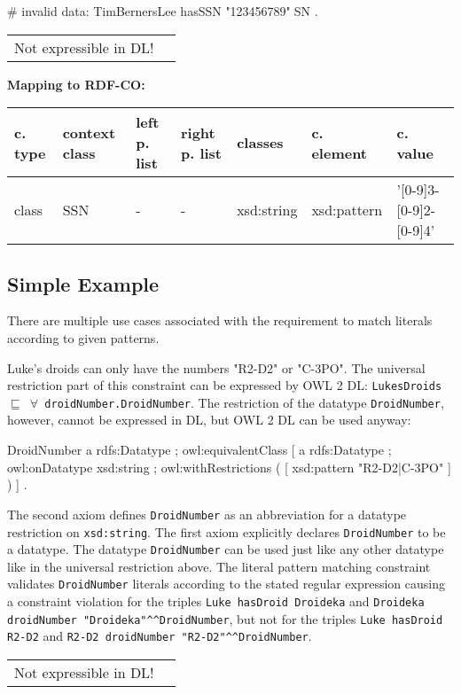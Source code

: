 \documentclass{llncs}
\newcommand{\ms}[1]{\texttt{#1}}
\newenvironment{gcotable}{
  \scriptsize
  \sffamily
  \vspace{0cm}
	\begin{center}
	\textbf{\vspace{0.4cm}Mapping to RDF-CO:} \\
  \begin{tabular}{l|l|l|l|l|l|l}
	\hline
  \textbf{c. type} & \textbf{context class} & \textbf{left p. list} & \textbf{right p. list} & \textbf{classes} & \textbf{c. element} & \textbf{c. value} \\
  \hline

}{
  \hline
  \end{tabular}
	\end{center}
}
\newenvironment{DL}{
  \vspace{0cm}
	\begin{center}
  \begin{tabular}{r l}

}{
  \end{tabular}
	\end{center}
}
\begin{document}
\begin{ex}
# invalid data:
TimBernersLee
    hasSSN "123456789"^^SSN .
\end{ex}

\begin{DL}
Not expressible in DL!
\end{DL}

\begin{gcotable}
class & SSN & - & - & xsd:string & xsd:pattern & '[0-9]{3}-[0-9]{2}-[0-9]{4}' \\
\end{gcotable}

\subsection{Simple Example}

There are multiple use cases associated with the requirement to match literals according to given patterns.

Luke's droids can only have the numbers "R2-D2" or "C-3PO".
The universal restriction part of this constraint can be expressed by OWL 2 DL:
\ms{LukesDroids $\sqsubseteq$ $\forall$ droidNumber.DroidNumber}.
The restriction of the datatype \ms{DroidNumber}, however, cannot be expressed in DL, but OWL 2 DL can be used anyway:

\begin{ex}
DroidNumber 
    a rdfs:Datatype ;
    owl:equivalentClass [
        a rdfs:Datatype ;
        owl:onDatatype xsd:string ;
        owl:withRestrictions ( 
            [ xsd:pattern "R2-D2|C-3PO" ] ) ] .
\end{ex}

The second axiom defines \ms{DroidNumber} as an abbreviation for a datatype restriction on \ms{xsd:string}. 
The first axiom explicitly declares \ms{DroidNumber} to be a datatype. 
The datatype \ms{DroidNumber} can be used just like any other datatype like in the universal restriction above.
The literal pattern matching constraint validates \ms{DroidNumber} literals according to the stated regular expression causing a constraint violation for the triples 
\ms{Luke hasDroid Droideka} and \ms{Droideka droidNumber "Droideka"\textasciicircum{}\textasciicircum{}DroidNumber}, 
but not for the triples \ms{Luke hasDroid R2-D2} and \ms{R2-D2 droidNumber "R2-D2"\textasciicircum{}\textasciicircum{}DroidNumber}.

\begin{DL}
Not expressible in DL!
\end{DL}
\end{document}
